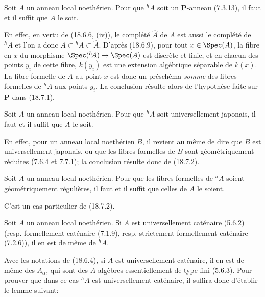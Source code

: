 
\begin{proposition}[18.7.2]
\label{IV.18.7.2}
Soit $A$ un anneau local noethérien. Pour que ${}^h\!A$ soit un $\mathbf P$-anneau (7.3.13), il faut et il suffit que $A$ le soit.
\end{proposition}

En effet, en vertu de (18.6.6, (iv)), le complété $\widehat A$ de $A$ est aussi le complété de ${}^h\!A$ et l'on a donc $A\subset{}^h\!A\subset\widehat A$. D'après (18.6.9), pour tout $x\in\Spec(A)$, la fibre en $x$ du morphisme $\Spec({}^h\!A)\to\Spec(A)$ est discrète et finie, et en chacun des points $y_i$ de cette fibre, $k(y_i)$ est une extension algébrique séparable de $k(x)$. La fibre formelle de $A$ au point $x$ est donc un préschéma \emph{somme} des fibres formelles de ${}^h\!A$ aux points $y_i$. La conclusion résulte alors de l'hypothèse faite sur $\mathbf P$ dans (18.7.1).

\begin{corollary}[18.7.3]
\label{IV.18.7.3}
Soit $A$ un anneau local noethérien. Pour que ${}^h\!A$ soit universellement japonais, il faut et il suffit que $A$ le soit.
\end{corollary}

En effet, pour un anneau local noethérien $B$, il revient au même de dire que $B$ est universellement japonais, ou que les fibres formelles de $B$ sont géométriquement réduites (7.6.4 et 7.7.1); la conclusion résulte donc de (18.7.2).

\begin{corollary}[18.7.4]
\label{IV.18.7.4}
Soit $A$ un anneau local noethérien. Pour que les fibres formelles de ${}^h\!A$ soient géométriquement régulières, il faut et il suffit que celles de $A$ le soient.
\end{corollary}

C'est un cas particulier de (18.7.2).

\begin{proposition}[18.7.5]
\label{IV.18.7.5}
Soit $A$ un anneau local noethérien. Si $A$ est universellement caténaire (5.6.2) (resp. formellement caténaire (7.1.9), resp. strictement formellement caténaire (7.2.6)), il en est de même de ${}^h\!A$.
\end{proposition}

Avec les notations de (18.6.4), si $A$ est universellement caténaire, il en est de même des $A_\alpha$, qui sont des $A$-algèbres essentiellement de type fini (5.6.3). Pour prouver que dans ce cas ${}^h\!A$ est universellement caténaire, il suffira donc d'établir le lemme suivant:

